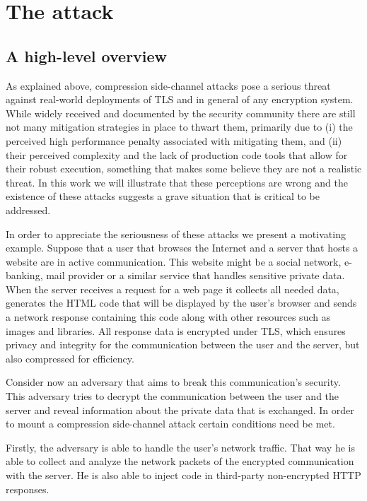 \section{The attack}\label{sec:attack}

\subsection{A high-level overview}\label{subsec:example}
As explained above, compression side-channel attacks pose a serious threat
against real-world deployments of TLS and in general of any encryption system.
While widely received and documented by the security community there are still
not many mitigation strategies in place to thwart them, primarily due to (i) the
perceived high performance penalty associated with mitigating them, and (ii)
their perceived complexity and the lack of production code tools that allow for
their robust execution, something that makes some believe they are not a
realistic threat. In this work we will illustrate that these perceptions are
wrong and the existence of these attacks suggests a grave situation that is
critical to be addressed.

In order to appreciate the seriousness of these attacks we present a motivating
example. Suppose that a user that browses the Internet and a server that hosts
a website are in active communication. This website might be a social network,
e-banking, mail provider or a similar service that handles sensitive private
data. When the server receives a request for a web page it collects all needed
data, generates the HTML code that will be displayed by the user's browser and
sends a network response containing this code along with other resources such as
images and libraries. All response data is encrypted under TLS, which ensures
privacy and integrity for the communication between the user and the server, but
also compressed for efficiency.

Consider now an adversary that aims to break this communication's security.
This adversary tries to decrypt the communication between the user and the
server and reveal information about the private data that is exchanged. In order
to mount a compression side-channel attack certain conditions need be met.

Firstly, the adversary is able to handle the user's network traffic. That way he
is able to collect and analyze the network packets of the encrypted
communication with the server. He is also able to inject code in third-party
non-encrypted HTTP responses.

